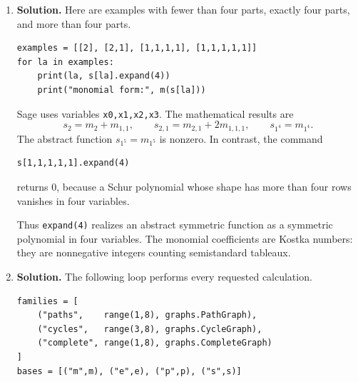 \documentclass{article}
\begin{document}
\begin{enumerate}
\item \textbf{Solution.}
Here are examples with fewer than four parts, exactly four parts, and
more than four parts.
\begin{verbatim}
examples = [[2], [2,1], [1,1,1,1], [1,1,1,1,1]]
for la in examples:
    print(la, s[la].expand(4))
    print("monomial form:", m(s[la]))
\end{verbatim}
Sage uses variables \texttt{x0,x1,x2,x3}.  The mathematical results are
\[
s_2=m_2+m_{1,1},\qquad
s_{2,1}=m_{2,1}+2m_{1,1,1},\qquad
s_{1^4}=m_{1^4}.
\]
The abstract function $s_{1^5}=m_{1^5}$ is nonzero.  In contrast, the
command
\begin{verbatim}
s[1,1,1,1,1].expand(4)
\end{verbatim}
returns $0$, because a Schur polynomial whose shape has more than four
rows vanishes in four variables.

Thus \texttt{expand(4)} realizes an abstract symmetric function as a
symmetric polynomial in four variables.  The monomial coefficients are
Kostka numbers: they are nonnegative integers counting semistandard
tableaux.

\item \textbf{Solution.}
The following loop performs every requested calculation.
\begin{verbatim}
families = [
    ("paths",    range(1,8), graphs.PathGraph),
    ("cycles",   range(3,8), graphs.CycleGraph),
    ("complete", range(1,8), graphs.CompleteGraph)
]
bases = [("m",m), ("e",e), ("p",p), ("s",s)]


\end{verbatim}
\end{enumerate}
\end{document}
